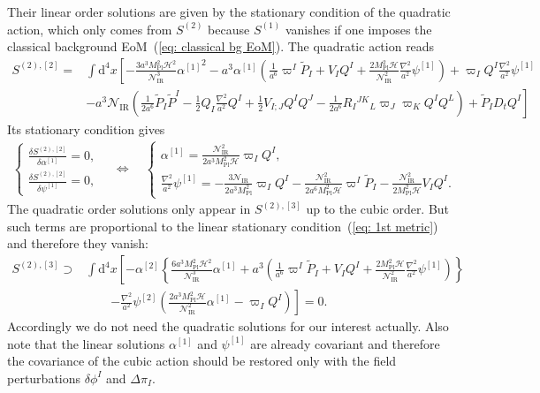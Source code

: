 \documentclass[aps, prd
, preprint
, nofootinbib 
, notitlepage
, longbibliography
]{revtex4-1}
\newcommand{\var}[2]{\frac{\delta #1}{\delta #2}}
\newcommand{\dd}{\mathrm{d}}
\newcommand{\Mpl}{M_\text{Pl}}
\newcommand{\IR}{\text{IR}}
\newcommand{\dps}{\displaystyle}
\newcommand{\calH}{\mathcal{H}}
\newcommand{\calN}{\mathcal{N}}
\newcommand{\dphi}{\delta\phi}
\newcommand{\Dpi}{\Delta\pi}
\newcommand{\bae}[1]{\begin{align} #1 \end{align}}
\newcommand{\bce}[1]{\begin{cases} #1 \end{cases}}
\begin{document}
Their linear order solutions are given by the stationary condition of the quadratic action, which only comes from $S^{(2)}$ because $S^{(1)}$ vanishes if one imposes
the classical background EoM~(\ref{eq: classical bg EoM}). The quadratic action reads
\bae{
	S^{(2),[2]}=&\int\dd^4x\left[-\frac{3a^3\Mpl^2\calH^2}{\calN_\IR^3}{\alpha^{[1]}}^2-a^3\alpha^{[1]}\left(\frac{1}{a^6}\varpi^I\tilde{P}_I+V_IQ^I
	+\frac{2\Mpl^2\calH}{\calN_\IR^2}\frac{\nabla^2}{a^2}\psi^{[1]}\right)+\varpi_IQ^I\frac{\nabla^2}{a^2}\psi^{[1]} \right. \nonumber \\
	&\left.-a^3\calN_\IR\left(\frac{1}{2a^6}\tilde{P}_I\tilde{P}^I-\frac{1}{2}Q_I\frac{\nabla^2}{a^2}Q^I+\frac{1}{2}V_{I;J}Q^IQ^J
	-\frac{1}{2a^6}R_I{}^{JK}{}_L\varpi_J\varpi_KQ^IQ^L\right)+\tilde{P}_ID_tQ^I\right]
}
Its stationary condition gives
\bae{\label{eq: 1st metric}
    \bce{
        \dps
        \var{S^{(2),[2]}}{\alpha^{[1]}}=0, \\
        \dps
        \var{S^{(2),[2]}}{\psi^{[1]}}=0,
    } \quad \Leftrightarrow \quad
    \bce{
        \dps
        \alpha^{[1]}=\frac{\calN_\IR^2}{2a^3\Mpl^2\calH}\varpi_IQ^I, \\
        \dps
        \frac{\nabla^2}{a^2}\psi^{[1]}=-\frac{3\calN_\IR}{2a^3\Mpl^2}\varpi_IQ^I-\frac{\calN_\IR^2}{2a^6\Mpl^2\calH}\varpi^I\tilde{P}_I-\frac{\calN_\IR^2}{2\Mpl^2\calH}V_IQ^I.
    }
}
The quadratic order solutions only appear in $S^{(2),[3]}$ up to the cubic order. But such terms are proportional to the linear stationary condition~(\ref{eq: 1st metric}) and therefore they vanish:
\bae{
    S^{(2),[3]}\supset&\int\dd^4x\left[-\alpha^{[2]}\left\{\frac{6a^3\Mpl^2\calH^2}{\calN_\IR^3}\alpha^{[1]}+a^3\left(\frac{1}{a^6}\varpi^I\tilde{P}_I+V_IQ^I+\frac{2\Mpl^2\calH}{\calN_\IR^2}\frac{\nabla^2}{a^2}\psi^{[1]}\right)\right\} \right. \nonumber \\
    &\qquad\left.-\frac{\nabla^2}{a^2}\psi^{[2]}\left(\frac{2a^3\Mpl^2\calH}{\calN_\IR^2}\alpha^{[1]}-\varpi_IQ^I\right)\right]=0.
}
Accordingly we do not need the quadratic solutions for our interest actually. Also note that the linear solutions $\alpha^{[1]}$ and $\psi^{[1]}$ are already covariant and therefore the covariance of the cubic action should be restored only with the field perturbations $\dphi^I$ and $\Dpi_I$.
\end{document}

